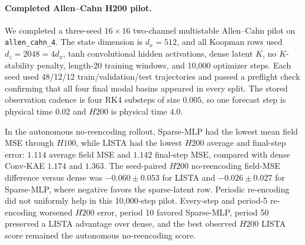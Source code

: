\paragraph{Completed Allen--Cahn H200 pilot.}
We completed a three-seed \(16\times16\) two-channel multistable Allen--Cahn pilot on \texttt{allen\_cahn\_4}. The state dimension is \(d_x=512\), and all Koopman rows used \(d_z=2048=4d_x\), tanh convolutional hidden activations, dense latent \(K\), no \(K\)-stability penalty, length-20 training windows, and 10,000 optimizer steps. Each seed used 48/12/12 train/validation/test trajectories and passed a preflight check confirming that all four final modal basins appeared in every split. The stored observation cadence is four RK4 substeps of size \(0.005\), so one forecast step is physical time \(0.02\) and \(H200\) is physical time \(4.0\).
\begin{table}[t]
  \centering
  \caption{Allen--Cahn H200 no-reencoding pilot. Entries are mean held-out field MSE across three seeds; lower is better.}
  \label{tab:allen_cahn_h200_no_reencode}
  
\end{table}
\begin{table}[t]
  \centering
  \caption{Allen--Cahn H200 field MSE by periodic re-encoding mode. Re-encoding decodes and re-encodes the model's own prediction; it never uses the future ground truth.}
  \label{tab:allen_cahn_h200_reencode_modes}
  
\end{table}
In the autonomous no-reencoding rollout, Sparse-MLP had the lowest mean field MSE through \(H100\), while LISTA had the lowest \(H200\) average and final-step error: \(1.114\) average field MSE and \(1.142\) final-step MSE, compared with dense Conv-KAE \(1.174\) and \(1.363\). The seed-paired \(H200\) no-reencoding field-MSE difference versus dense was \(-0.060\pm0.053\) for LISTA and \(-0.026\pm0.027\) for Sparse-MLP, where negative favors the sparse-latent row. Periodic re-encoding did not uniformly help in this 10,000-step pilot. Every-step and period-5 re-encoding worsened \(H200\) error, period 10 favored Sparse-MLP, period 50 preserved a LISTA advantage over dense, and the best observed \(H200\) LISTA score remained the autonomous no-reencoding score.

